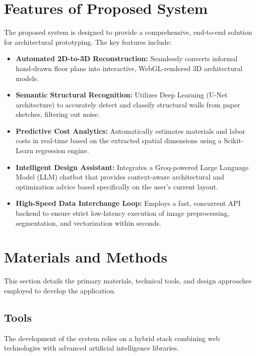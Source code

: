 \documentclass[12pt]{report}
\begin{document}
\section{Features of Proposed System}

The proposed system is designed to provide a comprehensive, end-to-end solution for architectural prototyping\cite{eastman2018}. The key features include:

\begin{itemize}
  \item \textbf{Automated 2D-to-3D Reconstruction:} Seamlessly converts informal hand-drawn floor plans into interactive, WebGL-rendered 3D architectural models\cite{liu2017, threejs2024}.
  \item \textbf{Semantic Structural Recognition:} Utilizes Deep Learning (U-Net architecture)\cite{ronneberger2015} to accurately detect and classify structural walls from paper sketches, filtering out noise\cite{opencv2024}.
  \item \textbf{Predictive Cost Analytics:} Automatically estimates materials and labor costs in real-time based on the extracted spatial dimensions using a Scikit-Learn regression engine\cite{sklearn2024, wang2020}.
  \item \textbf{Intelligent Design Assistant:} Integrates a Groq-powered Large Language Model (LLM) chatbot\cite{groq2024, brown2020} that provides context-aware architectural and optimization advice based specifically on the user's current layout.
  \item \textbf{High-Speed Data Interchange Loop:} Employs a fast, concurrent API backend\cite{fastapi2024} to ensure strict low-latency execution of image preprocessing, segmentation, and vectorization within seconds.
\end{itemize}

\section{Materials and Methods}

This section details the primary materials, technical tools, and design approaches employed to develop the application.

\subsection{Tools}

The development of the system relies on a hybrid stack combining web technologies with advanced artificial intelligence libraries.
\end{document}
